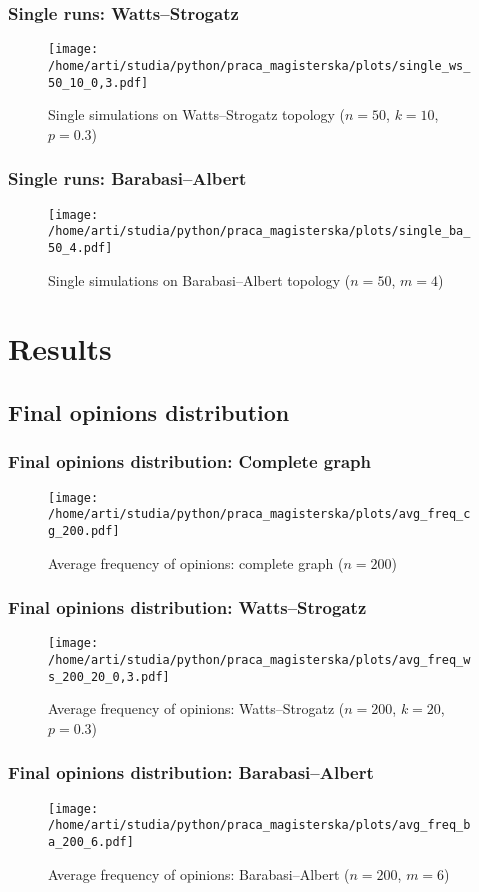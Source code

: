 \documentclass[a4paper, 11pt]{beamer}
\begin{document}
\begin{frame}
\frametitle{Single runs: Watts--Strogatz}
\begin{figure}[H]
		\centering
		\texttt{[image: /home/arti/studia/python/praca\_magisterska/plots/single\_ws\_50\_10\_0,3.pdf]}
		\caption{Single simulations on Watts--Strogatz topology ($n=50$, $k=10$, $p=0.3$)}
\end{figure}
\end{frame}

\begin{frame}
\frametitle{Single runs: Barabasi--Albert}
\begin{figure}[H]
		\centering
		\texttt{[image: /home/arti/studia/python/praca\_magisterska/plots/single\_ba\_50\_4.pdf]}
		\caption{Single simulations on Barabasi--Albert topology ($n=50$, $m=4$)}
\end{figure}
\end{frame}

\section{Results}

\subsection{Final opinions distribution}

\begin{frame}
\frametitle{Final opinions distribution: Complete graph}
\begin{figure}[H]
		\centering
		\texttt{[image: /home/arti/studia/python/praca\_magisterska/plots/avg\_freq\_cg\_200.pdf]}
		\caption{Average frequency of opinions: complete graph ($n=200$)}
\end{figure}
\end{frame}

\begin{frame}
\frametitle{Final opinions distribution: Watts--Strogatz}
\begin{figure}[H]
		\centering
		\texttt{[image: /home/arti/studia/python/praca\_magisterska/plots/avg\_freq\_ws\_200\_20\_0,3.pdf]}
		\caption{Average frequency of opinions: Watts--Strogatz ($n=200$, $k=20$, $p=0.3$)}
\end{figure}
\end{frame}


\begin{frame}
\frametitle{Final opinions distribution: Barabasi--Albert}
\begin{figure}[H]
		\centering
		\texttt{[image: /home/arti/studia/python/praca\_magisterska/plots/avg\_freq\_ba\_200\_6.pdf]}
		\caption{Average frequency of opinions: Barabasi--Albert ($n=200$, $m=6$)}
\end{figure}
\end{frame}
\end{document}
